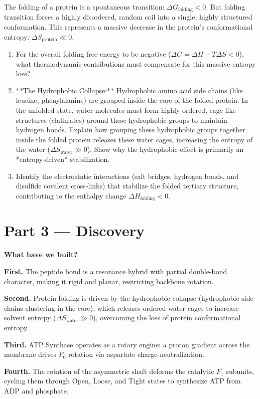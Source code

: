 \documentclass[12pt, a4paper]{book}
\begin{document}
\begin{explobox}
The folding of a protein is a spontaneous transition: $\Delta G_{\text{folding}} < 0$.
But folding transition forces a highly disordered, random coil into a single, highly structured conformation.
This represents a massive decrease in the protein's conformational entropy: $\Delta S_{\text{protein}} \ll 0$.
\begin{enumerate}[label=(\alph*), leftmargin=*]
  \item For the overall folding free energy to be negative ($\Delta G = \Delta H - T\Delta S < 0$), what thermodynamic contributions must compensate for this massive entropy loss?
  \item **The Hydrophobic Collapse:** Hydrophobic amino acid side chains (like leucine, phenylalanine) are grouped inside the core of the folded protein.
        In the unfolded state, water molecules must form highly ordered, cage-like structures (clathrates) around these hydrophobic groups to maintain hydrogen bonds.
        Explain how grouping these hydrophobic groups together inside the folded protein releases these water cages, increasing the entropy of the water ($\Delta S_{\text{water}} \gg 0$).
        Show why the hydrophobic effect is primarily an *entropy-driven* stabilization.
  \item Identify the electrostatic interactions (salt bridges, hydrogen bonds, and disulfide covalent cross-links) that stabilize the folded tertiary structure, contributing to the enthalpy change $\Delta H_{\text{folding}} < 0$.
\end{enumerate}
\end{explobox}

\newpage

\section{Part 3 --- Discovery}

\begin{discoverybox}
\textbf{What have we built?}

\textbf{First.} The peptide bond is a resonance hybrid with partial double-bond character, making it rigid and planar, restricting backbone rotation.

\textbf{Second.} Protein folding is driven by the hydrophobic collapse (hydrophobic side chains clustering in the core), which releases ordered water cages to increase solvent entropy ($\Delta S_{\text{water}} \gg 0$), overcoming the loss of protein conformational entropy.

\textbf{Third.} ATP Synthase operates as a rotary engine: a proton gradient across the membrane drives $F_0$ rotation via aspartate charge-neutralization.

\textbf{Fourth.} The rotation of the asymmetric shaft deforms the catalytic $F_1$ subunits, cycling them through Open, Loose, and Tight states to synthesize ATP from ADP and phosphate.
\\
\end{discoverybox}
\end{document}
